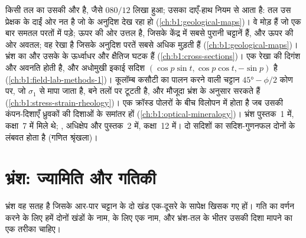 \begin{recall}
किसी तल का  उसकी  और  है, जैसे $080/12$ लिखा हुआ; उसका  दाएँ-हाथ नियम से आता है: तल उस प्रेक्षक के दाईं ओर नत है जो  के अनुदिश देख रहा हो (\cref{ch:b1:geological-maps})।  वे मोड़ हैं जो एक बार समतल परतों में पड़े;  ऊपर की ओर उत्तल है, जिसके केंद्र में सबसे पुरानी चट्टानें हैं, और  ऊपर की ओर अवतल;  वह रेखा है जिसके अनुदिश परतें सबसे अधिक मुड़ती हैं (\cref{ch:b1:geological-maps})। भ्रंश का  और  उसके  के ऊर्ध्वाधर और क्षैतिज घटक हैं (\cref{ch:b1:cross-sections})। एक रेखा की दिगंश और अवनति होती है, और अधोमुखी इकाई सदिश $(\cos p\sin t, \cos p\cos t, -\sin p)$ है (\cref{ch:b1:field-lab-methods-1})। कूलॉम्ब कसौटी का पालन करने वाली चट्टान $\ang{45} - \phi/2$ कोण पर, जो $\sigma_1$ से मापा जाता है, बने तलों पर टूटती है, और मौजूदा भ्रंश  के अनुसार सरकते हैं (\cref{ch:b1:stress-strain-rheology})। एक  क्रॉस्ड पोलरों के बीच विलोपन में होता है जब उसकी कंपन-दिशाएँ ध्रुवकों की दिशाओं के समांतर हों (\cref{ch:b1:optical-mineralogy})। भ्रंश पुस्तक~1 में, कक्षा~7 में मिले थे; , अधिक्षेप और  पुस्तक~2 में, कक्षा~12 में। दो सदिशों का सदिश-गुणनफल दोनों के लंबवत होता है (गणित श्रृंखला)।
\end{recall}

\section{भ्रंश: ज्यामिति और गतिकी}\label{sec:b1:faults-folds-fabrics:faults}

भ्रंश वह सतह है जिसके आर-पार चट्टान के दो खंड एक-दूसरे के सापेक्ष खिसक गए हों। गति का वर्णन करने के लिए हमें दोनों खंडों के नाम,  के लिए एक नाम, और भ्रंश-तल के भीतर उसकी दिशा मापने का एक तरीका चाहिए।

